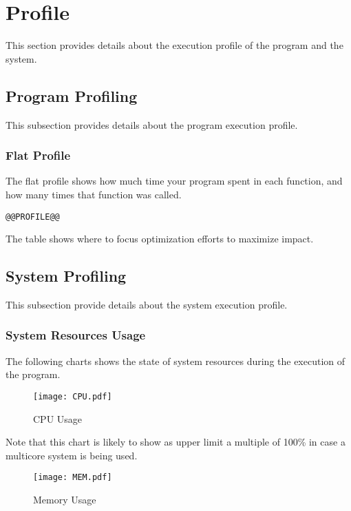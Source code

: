 \documentclass[a4paper]{article}
\begin{document}
\section{Profile}

This section provides details about the execution profile of the program and the system.

\subsection{Program Profiling}

This subsection provides details about the program execution profile.


\subsubsection{Flat Profile}

The flat profile shows how much time your program spent in each function, and how many times that function was called.

\begin{verbatim}
@@PROFILE@@
\end{verbatim}

The table shows where to focus optimization efforts to maximize impact.

\subsection{System Profiling}

This subsection provide details about the system execution profile.

\subsubsection{System Resources Usage}

The following charts shows the state of system resources during the execution of the program.

\begin{figure}[H]
\label{fig:cpu}
\centering
\texttt{[image: CPU.pdf]}
\caption{CPU Usage}
\end{figure}

Note that this chart is likely to show as upper limit a multiple of 100\% in case a multicore system is being used.

\begin{figure}[H]
\label{fig:memory}
\centering
\texttt{[image: MEM.pdf]}
\caption{Memory Usage}
\end{figure}
\end{document}
